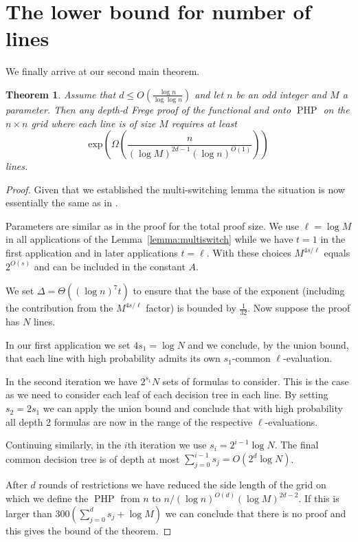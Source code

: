 \documentclass{article}\usepackage[a4paper,margin=20mm]{geometry}
\newtheorem{theorem}{Theorem}\newtheorem{lemma}[theorem]{Lemma}\newtheorem{proposition}[theorem]{Proposition}\newtheorem{corollary}[theorem]{Corollary}\newtheorem{definition}[theorem]{Definition}\newtheorem{claim}[theorem]{Claim}\newtheorem{remark}[theorem]{Remark}\newtheorem{observation}[theorem]{Observation}\newtheorem{conjecture}[theorem]{Conjecture}\newtheorem{example}[theorem]{Example}
\DeclareMathOperator{\PHP}{PHP}
\begin{document}
\section{The lower bound for number of
lines}\label{sec:nlines}

We finally arrive at our second main theorem.

\begin{theorem}\label{thm:lines}
Assume that $d \leq O(\frac{\log n}{\log {\log n}})$ and let
$n$ be an odd integer and $M$ a parameter. 
Then any depth-$d$ Frege proof of
the functional and onto $\PHP$ on the $n \times n$ grid where each line
is of size $M$ requires at least
$$
\mbox{exp} \left(\Omega \left(\frac {n}{(\log M)^{2d-1} (\log n)^{O(1)}}\right)\right)
$$
lines.
\end{theorem}

\begin{proof}
Given that we established the multi-switching lemma
the situation is now essentially the same as 
in \cite{jhkr}.  

Parameters are similar as in the proof for the total proof
size.   We use $\ell= \log M$ in all applications
of the Lemma~\ref{lemma:multiswitch}
while we have $t=1$ in the
first application and in later applications $t=\ell$.
With these choices $M^{4s /\ell}$ equals
$2^{O(s)}$ and can be included in the constant $A$.

We set $\Delta = \Theta ((\log n)^7 t)$ to ensure that the 
base of the exponent (including the contribution from the $M^{4s/ \ell}$
factor) is bounded by $\frac 1{32}$.  Now suppose the
proof has $N$ lines.  

In our first application we set $4s_1= \log N$ and
we conclude, by the union bound,  that each line with
high probability admits its own $s_1$-common
$\ell$-evaluation.

In the second iteration we have $2^{s_1} N $ sets of
formulas to consider.  This is the case as we need to consider
each leaf of each decision tree in each line.
By setting $s_2= 2 s_1$ we can apply the union
bound and conclude that with high probability all
depth 2 formulas are now in the range of the
respective $\ell$-evaluations.

Continuing similarly, in the $i$th iteration we use $s_i=2^{i-1} \log N$.
The final common decision tree is 
of depth at most $\sum_{j=0}^{i-1} s_j= O(2^d \log N)$.

After $d$ rounds of restrictions we have reduced the 
side length of the grid on which we define the $\PHP$ from $n$ to $n/ (\log n)^{O(d)} (\log M)^{2d-2}$.
If this is larger than $300(\sum_{j=0}^{d} s_j + \log M)$
we can conclude that there is no proof and this gives
the bound of the theorem.
\end{proof}
\end{document}
